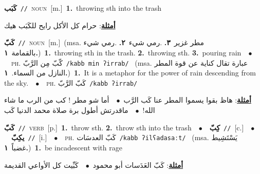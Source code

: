 \documentclass[10pt,a4paper,twoside]{article} %
\begin{document}
\begin{multicols}{2}
{\setlength\topsep{0pt}\textbf{\foreignlanguage{arabic}{كَبَب}}\ {\color{gray}\texttt{//}\color{black}}\ \textsc{noun}\ [m.]\ \textbf{1.}~throwing sth into the trash\  \begin{flushright}\color{gray}\foreignlanguage{arabic}{\textbf{\underline{\foreignlanguage{arabic}{أمثلة}}}: حرام كل الأكل رايح للكَبَب هيك}\end{flushright}\color{black}} \vspace{2mm}

{\setlength\topsep{0pt}\textbf{\foreignlanguage{arabic}{كَبّ}}\ {\color{gray}\texttt{//}\color{black}}\ \textsc{noun}\ [m.]\ \color{gray}(msa. \foreignlanguage{arabic}{مطر غزير}~\foreignlanguage{arabic}{\textbf{٣.}}  .\foreignlanguage{arabic}{رمي شيء}~\foreignlanguage{arabic}{\textbf{٢.}}  .\foreignlanguage{arabic}{رمي شيء بالقمامة}~\foreignlanguage{arabic}{\textbf{١.}})\color{black}\ \textbf{1.}~throwing sth in the trash.  \textbf{2.}~throwing sth.  \textbf{3.}~pouring rain\ \ $\bullet$\ \ \textsc{ph.} \color{gray} \foreignlanguage{arabic}{كّبّ مِن الرَّبّ}\color{black}\ {\color{gray}\texttt{/{\sffamily kabb min ʔirrab}/}\color{black}}\ \color{gray} (msa. \foreignlanguage{arabic}{عبارة تقال كناية عن قوة المطر النازل من السماء.}~\foreignlanguage{arabic}{\textbf{١.}})\color{black}\ \textbf{1.}~It is a metaphor for the power of rain descending from the sky.\ \ $\bullet$\ \ \textsc{ph.} \color{gray} \foreignlanguage{arabic}{كَبّ الرَّبّ}\color{black}\ {\color{gray}\texttt{/{\sffamily kabb ʔirrab}/}\color{black}}\  \begin{flushright}\color{gray}\foreignlanguage{arabic}{\textbf{\underline{\foreignlanguage{arabic}{أمثلة}}}: هاظ بقوا يسموا المطر عنا كَب الرَّب\ $\bullet$\ \  أما شو مطر ! كب من الرب ما شاء الله!\ $\bullet$\ \  ماقدرتش أطول برة صلاة محمد الدنيا كَب}\end{flushright}\color{black}} \vspace{2mm}

{\setlength\topsep{0pt}\textbf{\foreignlanguage{arabic}{كَبّ}}\ {\color{gray}\texttt{//}\color{black}}\ \textsc{verb}\ [p.]\ \textbf{1.}~throw sth.  \textbf{2.}~throw sth into the trash\ \ $\bullet$\ \ \setlength\topsep{0pt}\textbf{\foreignlanguage{arabic}{كِبّ}}\ {\color{gray}\texttt{//}\color{black}}\ [c.]\ \ $\bullet$\ \ \setlength\topsep{0pt}\textbf{\foreignlanguage{arabic}{يكِبّ}}\ {\color{gray}\texttt{//}\color{black}}\ [i.]\ \ $\bullet$\ \ \textsc{ph.} \color{gray} \foreignlanguage{arabic}{كَبّ العدسَات}\color{black}\ {\color{gray}\texttt{/{\sffamily kabb ʔilʕadasaːt}/}\color{black}}\ \color{gray} (msa. \foreignlanguage{arabic}{يَسْتَشِيط غضباً}~\foreignlanguage{arabic}{\textbf{١.}})\color{black}\ \textbf{1.}~be incadescent with rage\  \begin{flushright}\color{gray}\foreignlanguage{arabic}{\textbf{\underline{\foreignlanguage{arabic}{أمثلة}}}: كَبّ العَدَسات أبو محمود\ $\bullet$\ \  كَبِّيت كل الأواعي القديمة}\end{flushright}\color{black}} \vspace{2mm}


\end{multicols}
\end{document}
